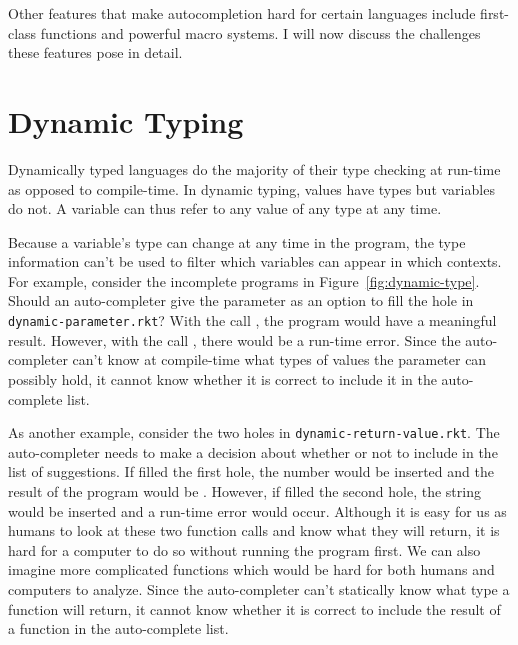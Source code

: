 \documentclass[ms,electronic,twosidetoc,letterpaper,chaptercenter,parttop,lol,lof,lot]{byumsphd}
\begin{document}
Other features that make autocompletion hard for certain languages include first-class functions and powerful macro systems.
I will now discuss the challenges these features pose in detail.


\section{Dynamic Typing}

Dynamically typed languages do the majority of their type checking at run-time as opposed to compile-time.
In dynamic typing, values have types but variables do not.
A variable can thus refer to any value of any type at any time.

Because a variable's type can change at any time in the program, the type information can't be used to filter which variables can appear in which contexts.
For example, consider the incomplete programs in Figure~\ref{fig:dynamic-type}.
Should an auto-completer give the parameter  as an option to fill the hole in \texttt{dynamic-parameter.rkt}?
With the call , the program would have a meaningful result.
However, with the call , there would be a run-time error.
Since the auto-completer can't know at compile-time what types of values the parameter  can possibly hold, it cannot know whether it is correct to include it in the auto-complete list.

As another example, consider the two holes in \texttt{dynamic-return-value.rkt}.
The auto-completer needs to make a decision about whether or not to include  in the list of suggestions.
If  filled the first hole, the number  would be inserted and the result of the program would be .
However, if  filled the second hole, the string  would be inserted and a run-time error would occur.
Although it is easy for us as humans to look at these two function calls and know what they will return, it is hard for a computer to do so without running the program first.
We can also imagine more complicated functions which would be hard for both humans and computers to analyze.
Since the auto-completer can't statically know what type a function will return, it cannot know whether it is correct to include the result of a function in the auto-complete list.
\end{document}
